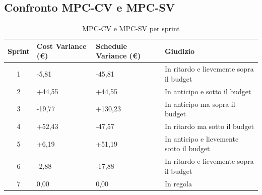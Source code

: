 \documentclass[a4paper, 10pt, colorlinks=true, linkcolor=black, urlcolor=blue, citecolor=blue, hidelinks]{article}
\begin{document}
\subsection{Confronto MPC-CV e MPC-SV}
\begin{table}[H]
    \centering
	\begin{tabular}{|c|l|l|p{3cm}|}
		\hline
		\textbf{Sprint} & \textbf{Cost Variance (€)} & \textbf{Schedule Variance (€)} & \textbf{Giudizio} \\
		\hline
		1 & -5,81 & -45,81 & In ritardo e lievemente sopra il budget\\ 
		\hline
        2 & +44,55 & +44,55 & In anticipo e sotto il budget \\
        \hline
        3 & -19,77 & +130,23 & In anticipo ma sopra il budget \\
        \hline
        4 & +52,43 & -47,57 & In ritardo ma sotto il budget \\
        \hline
        5 & +6,19 & +51,19 & In anticipo e lievemente sotto il budget \\
        \hline
        6 & -2,88 & -17,88 & In ritardo e lievemente sopra il budget \\
        \hline
        7 & 0,00 & 0,00 & In regola \\
        \hline
	\end{tabular}
	\caption{MPC-CV e MPC-SV per sprint}
	\label{tab:cv-sv}
\end{table}
\end{document}
